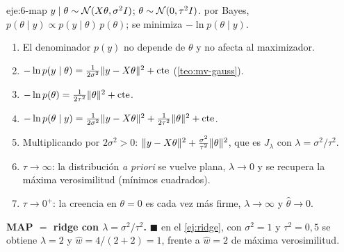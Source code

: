 \begin{solucion}{eje:6-map}
\datos $y\mid\theta\sim\mathcal{N}(X\theta,\sigma^{2}I)$; $\theta\sim\mathcal{N}(0,\tau^{2}I)$.
\planteamiento por Bayes, $p(\theta\mid y)\propto p(y\mid\theta)\,p(\theta)$; se minimiza $-\ln p(\theta\mid y)$.
\pasos
\begin{enumerate}[label=\arabic*.]
  \item El denominador $p(y)$ no depende de $\theta$ y no afecta al maximizador.
  \item $-\ln p(y\mid\theta)=\frac{1}{2\sigma^{2}}\lVert y-X\theta\rVert^{2}+\text{cte}$ (\cref{teo:mv-gauss}).
  \item $-\ln p(\theta)=\frac{1}{2\tau^{2}}\lVert\theta\rVert^{2}+\text{cte}$.
  \item $-\ln p(\theta\mid y)=\frac{1}{2\sigma^{2}}\lVert y-X\theta\rVert^{2}+\frac{1}{2\tau^{2}}\lVert\theta\rVert^{2}+\text{cte}$.
  \item Multiplicando por $2\sigma^{2}>0$: $\lVert y-X\theta\rVert^{2}+\frac{\sigma^{2}}{\tau^{2}}\lVert\theta\rVert^{2}$, que es $J_\lambda$ con $\lambda=\sigma^{2}/\tau^{2}$.
  \item $\tau\to\infty$: la distribución \emph{a priori} se vuelve plana, $\lambda\to 0$ y se recupera la máxima verosimilitud (mínimos cuadrados).
  \item $\tau\to 0^{+}$: la creencia en $\theta=0$ es cada vez más firme, $\lambda\to\infty$ y $\hat\theta\to 0$.
\end{enumerate}
\resultado \textbf{MAP $=$ ridge con $\lambda=\sigma^{2}/\tau^{2}$.} $\blacksquare$
\comprobacion en el \cref{ej:ridge}, con $\sigma^{2}=1$ y $\tau^{2}=0{,}5$ se obtiene $\lambda=2$ y $\hat w=4/(2+2)=1$, frente a $\hat w=2$ de máxima verosimilitud.
\end{solucion}

